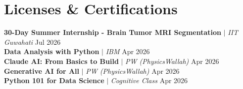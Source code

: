 \documentclass[letterpaper,11pt]{article}
\begin{document}
\section{Licenses \& Certifications}
 \begin{itemize}[leftmargin=0.15in, label={}]
    \small{\item{
     \textbf{30-Day Summer Internship - Brain Tumor MRI Segmentation} $|$ \emph{IIT Guwahati} \hfill Jul 2026 \\
     \textbf{Data Analysis with Python} $|$ \emph{IBM} \hfill Apr 2026 \\
     \textbf{Claude AI: From Basics to Build} $|$ \emph{PW (PhysicsWallah)} \hfill Apr 2026 \\
     \textbf{Generative AI for All} $|$ \emph{PW (PhysicsWallah)} \hfill Apr 2026 \\
     \textbf{Python 101 for Data Science} $|$ \emph{Cognitive Class} \hfill Apr 2026
    }}
 \end{itemize}

\end{document}
